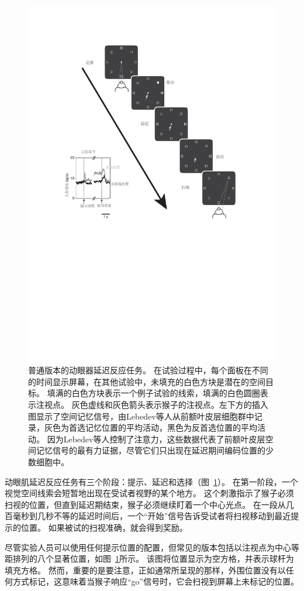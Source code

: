 \begin{figure}
	\centering
	\includegraphics[width=0.7\linewidth]{image_pfc/Fig_5_4}
	\caption{普通版本的动眼器延迟反应任务。
		在试验过程中，每个面板在不同的时间显示屏幕，在其他试验中，未填充的白色方块是潜在的空间目标。
		填满的白色方块表示一个例子试验的线索，填满的白色圆圈表示注视点。
		灰色虚线和灰色箭头表示猴子的注视点。左下方的插入图显示了空间记忆信号，由Lebedev等人\cite{lebedev2004representation}从前额叶皮层细胞群中记录，灰色为首选记忆位置的平均活动，黑色为反首选位置的平均活动。
		因为Lebedev等人控制了注意力，这些数据代表了前额叶皮层空间记忆信号的最有力证据，尽管它们只出现在延迟期间编码位置的少数细胞中。}
	\label{fig:fig_5_4}
\end{figure}


动眼肌延迟反应任务有三个阶段：提示、延迟和选择（图~\ref{fig:fig_5_4}）。
在第一阶段，一个视觉空间线索会短暂地出现在受试者视野的某个地方。
这个刺激指示了猴子必须扫视的位置，但直到延迟期结束，猴子必须继续盯着一个中心光点。
在一段从几百毫秒到几秒不等的延迟时间后，一个“开始”信号告诉受试者将扫视移动到最近提示的位置。
如果被试的扫视准确，就会得到奖励。


尽管实验人员可以使用任何提示位置的配置，但常见的版本包括以注视点为中心等距排列的八个显著位置，如图~\ref{fig:fig_5_4}所示。
该图将位置显示为空方格，并表示球杆为填充方格。
然而，重要的是要注意，正如通常所呈现的那样，外围位置没有以任何方式标记，这意味着当猴子响应“go”信号时，它会扫视到屏幕上未标记的位置。


